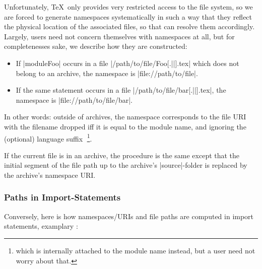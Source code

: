    Unfortunately, \TeX\ only provides very restricted access to
   the file system, so we are forced to generate namespaces
   systematically in such a way that they reflect the physical
   location of the associated files, so that \sTeX can resolve
   them accordingly. Largely, users need not concern themselves
   with namespaces at all, but for completenesses sake, we describe
   how they are constructed:

   \begin{itemize}
     \item If |{module}{Foo}| occurs in a file
       |/path/to/file/Foo[.||].tex| which does not belong
       to an archive, the namespace is |file://path/to/file|.
     \item If the same statement occurs in a file
       |/path/to/file/bar[.||].tex|, the namespace is 
       |file://path/to/file/bar|.
   \end{itemize}

   In other words: outside of archives, the namespace corresponds to
   the file URI with the filename dropped iff it is equal to the
   module name, and ignoring the (optional) language suffix^^A
   \footnote{which is internally attached to the module name instead,
   but a user need not worry about that.}.

   If the current file is in an archive, the procedure is the same
   except that the initial segment of the file path up to the archive's
   |source|-folder is replaced by the archive's namespace URI.

 \subsubsection{Paths in Import-Statements}

 Conversely, here is how namespaces/URIs and file paths are computed
 in import statements, examplary :

